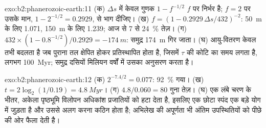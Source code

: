 \begin{solution}{exo:b2:phanerozoic-earth:11}
(क) $\Delta s$ में केवल गुणक $1 - f^{-1/2}$ $f$ पर निर्भर है; $f = 2$ पर उसके मान,
$1 - 2^{-1/2} = 0.2929$, से भाग दीजिए। (ख) $f = (1 - 0.2929\,\Delta s/432)^{-2}$: \qty{50}{m} के लिए 1.071,
\qty{150}{m} के लिए 1.239; आज से 7 से \qty{24}{\percent} तेज़। (ग) $432 \times (1 -
0.8^{-1/2})/0.2929 = \qty{-174}{m}$: समुद्र \qty{174}{m} गिर जाता। (घ) आयु-वितरण
केवल तभी बदलता है जब पुराना तल क्षेपित होकर प्रतिस्थापित होता है, जिसमें $\tau$ की कोटि का समय लगता है,
लगभग \qty{100}{Myr}; समुद्र दसियों मिलियन वर्षों में उसका अनुसरण करता है।
\end{solution}

\begin{solution}{exo:b2:phanerozoic-earth:12}
(क) $2^{-7.4/2} = 0.077$: \qty{92}{\percent} गया। (ख) $t = 2\log_2(1/0.19) = \qty{4.8}{Myr}$।
(ग) $4.8/0.060 = 80$ गुना तेज़। (घ) एक लंबे चरण के भीतर, अकेला पृष्ठभूमि विलोपन अधिकांश
प्रजातियों को हटा देता है, इसलिए एक छोटा स्पंद एक बड़े योग में जुड़ता है और उससे अलग करना कठिन होता है;
अभिलेख की अपूर्णता भी अंतिम उपस्थितियों को पीछे की ओर फैला देती है।
\end{solution}

